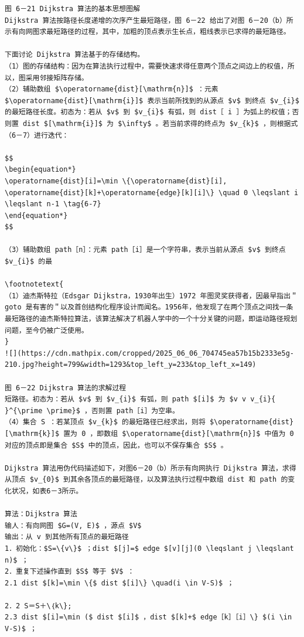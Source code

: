 \documentclass[10pt]{article}
\let\svthefootnote\thefootnote
\newcommand\blfootnotetext[1]{%
  \let\thefootnote\relax\footnote{#1}%
  \addtocounter{footnote}{-1}%
  \let\thefootnote\svthefootnote%
}
\let\svfootnotetext\footnotetext
\renewcommand\footnotetext[2][?]{%
  \if\relax#1\relax%
    \ifnum\value{footnote}=0\blfootnotetext{#2}\else\svfootnotetext{#2}\fi%
  \else%
    \if?#1\ifnum\value{footnote}=0\blfootnotetext{#2}\else\svfootnotetext{#2}\fi%
    \else\svfootnotetext[#1]{#2}\fi%
  \fi
}
\begin{document}
\begin{verbatim}
图 6－21 Dijkstra 算法的基本思想图解
Dijkstra 算法按路径长度递增的次序产生最短路径，图 6－22 给出了对图 6－20（b）所示有向网图求最短路径的过程，其中，加粗的顶点表示生长点，粗线表示已求得的最短路径。

下面讨论 Dijkstra 算法基于的存储结构。
（1）图的存储结构：因为在算法执行过程中，需要快速求得任意两个顶点之间边上的权值，所以，图采用邻接矩阵存储。
（2）辅助数组 $\operatorname{dist}[\mathrm{n}]$ ：元素 $\operatorname{dist}[\mathrm{i}]$ 表示当前所找到的从源点 $v$ 到终点 $v_{i}$ 的最短路径长度。初态为：若从 $v$ 到 $v_{i}$ 有弧，则 dist［ i ］为弧上的权值；否则置 dist $[\mathrm{i}]$ 为 $\infty$ 。若当前求得的终点为 $v_{k}$ ，则根据式（6－7）进行迭代：

$$
\begin{equation*}
\operatorname{dist}[i]=\min \{\operatorname{dist}[i], \operatorname{dist}[k]+\operatorname{edge}[k][i]\} \quad 0 \leqslant i \leqslant n-1 \tag{6-7}
\end{equation*}
$$

（3）辅助数组 path［n］：元素 path［i］是一个字符串，表示当前从源点 $v$ 到终点 $v_{i}$ 的最

\footnotetext{
（1）迪杰斯特拉（Edsgar Dijkstra，1930年出生）1972 年图灵奖获得者，因最早指出＂goto 是有害的＂以及首创结构化程序设计而闻名。1956年，他发现了在两个顶点之间找一条最短路径的迪杰斯特拉算法，该算法解决了机器人学中的一个十分关键的问题，即运动路径规划问题，至今仍被广泛使用。
}
![](https://cdn.mathpix.com/cropped/2025_06_06_704745ea57b15b2333e5g-210.jpg?height=799&width=1293&top_left_y=233&top_left_x=149)

图 6－22 Dijkstra 算法的求解过程
短路径。初态为：若从 $v$ 到 $v_{i}$ 有弧，则 path $[i]$ 为 $v v v_{i}{ }^{\prime \prime}$ ，否则置 path［i］为空串。
（4）集合 S ：若某顶点 $v_{k}$ 的最短路径已经求出，则将 $\operatorname{dist}[\mathrm{k}]$ 置为 0 ，即数组 $\operatorname{dist}[\mathrm{n}]$ 中值为 0 对应的顶点即是集合 $S$ 中的顶点，因此，也可以不保存集合 $S$ 。

Dijkstra 算法用伪代码描述如下，对图6－20（b）所示有向网执行 Dijkstra 算法，求得从顶点 $v_{0}$ 到其余各顶点的最短路径，以及算法执行过程中数组 dist 和 path 的变化状况，如表6－3所示。

算法：Dijkstra 算法
输人：有向网图 $G=(V, E)$ ，源点 $V$
输出：从 v 到其他所有顶点的最短路径
1．初始化：$S=\{v\}$ ；dist $[j]=$ edge $[v][j](0 \leqslant j \leqslant n)$ ；
2．重复下述操作直到 $S$ 等于 $V$ ：
2.1 dist $[k]=\min \{$ dist $[i]\} \quad(i \in V-S)$ ；

2．2 S＝S＋\｛k\};
2.3 dist $[i]=\min ($ dist $[i]$ ，dist $[k]+$ edge［k］［i］\} $(i \in V-S)$ ；


\end{verbatim}
\end{document}

